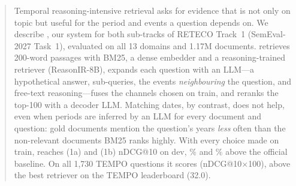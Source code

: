 \begin{abstract}
Temporal reasoning-intensive retrieval asks for evidence that is not only on topic but useful
for the period and events a question depends on. We describe \sys, our system for both
sub-tracks of RETECO Track~1 (SemEval-2027 Task~1), evaluated on all 13 domains and 1.17M
documents. \sys retrieves 200-word passages with BM25, a dense embedder and a reasoning-trained
retriever (ReasonIR-8B), expands each question with an LLM---a hypothetical answer, sub-queries,
the events \emph{neighbouring} the question, and free-text reasoning---fuses the channels chosen
on train, and reranks the top-100 with a decoder LLM. Matching dates, by contrast, does not
help, even when periods are inferred by an LLM for every document and question: gold documents
mention the question's years \emph{less} often than the non-relevant documents BM25 ranks
highly. With every choice made on train, \sys reaches \rFinalA{} (1a) and \rFinalB{} (1b)
nDCG@10 on dev, \gainOfficialA\% and \gainOfficialB\% above the official baseline. On all
1{,}730 TEMPO questions it scores \pooledFinalA{} (nDCG@10$\times$100), above the best retriever
on the TEMPO leaderboard (32.0).
\end{abstract}
